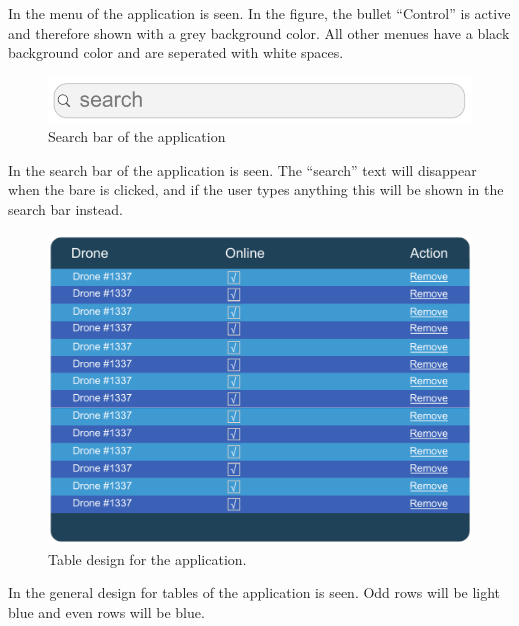 In  the menu of the application is seen. 
In the figure, the bullet ``Control'' is active and therefore shown with a grey background color. 
All other menues have a black background color and are seperated with white spaces.

\begin{figure}[htb]
    \centering
    \includegraphics[width=\textwidth]{gfx/search.pdf}
    \caption{Search bar of the application}
    \label{fig:search_bar_design}
\end{figure}

In  the search bar of the application is seen. 
The ``search'' text will disappear when the bare is clicked, and if the user types anything this will be shown in the search bar instead.

\begin{figure}[htb]
    \centering
    \includegraphics[width=\textwidth]{gfx/table.pdf}
    \caption{Table design for the application.}
    \label{fig:table_design}
\end{figure}
In  the general design for tables of the application is seen. 
Odd rows will be light blue and even rows will be blue.

